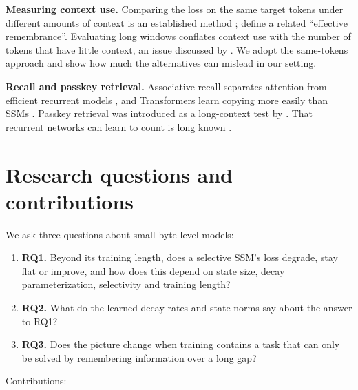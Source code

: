 \documentclass[11pt]{article}
\begin{document}
\textbf{Measuring context use.} Comparing the loss on the same target tokens under different amounts of context is an established method \citep{khandelwal2018sharp,sun2021longrange}; \citet{buitrago2025unexplored} define a related ``effective remembrance''. Evaluating long windows conflates context use with the number of tokens that have little context, an issue discussed by \citet{press2021shortformer}. We adopt the same-tokens approach and show how much the alternatives can mislead in our setting.

\textbf{Recall and passkey retrieval.} Associative recall separates attention from efficient recurrent models \citep{arora2024zoology}, and Transformers learn copying more easily than SSMs \citep{jelassi2024repeat}. Passkey retrieval was introduced as a long-context test by \citet{mohtashami2023landmark}. That recurrent networks can learn to count is long known \citep{weiss2018practical}.

\section{Research questions and contributions}\label{sec:rq}

We ask three questions about small byte-level models:

\begin{enumerate}
  \item \textbf{RQ1.} Beyond its training length, does a selective SSM's loss degrade, stay flat or improve, and how does this depend on state size, decay parameterization, selectivity and training length?
  \item \textbf{RQ2.} What do the learned decay rates and state norms say about the answer to RQ1?
  \item \textbf{RQ3.} Does the picture change when training contains a task that can only be solved by remembering information over a long gap?
\end{enumerate}

Contributions:
\end{document}

